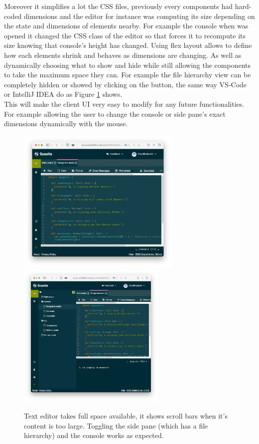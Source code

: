 \documentclass[a4paper,11pt,oneside]{report}
\begin{document}
Moreover it simplifies a lot the CSS files, previously every components had hard-coded dimensions and the editor for instance was computing its size depending on the state and dimensions of elements nearby. For example the console when was opened it changed the CSS class of the editor so that forces it to recompute its size knowing that console's height has changed. Using flex layout allows to define how each elements shrink and behaves as dimensions are changing. As well as dynamically choosing what to show and hide while still allowing the components to take the maximum space they can. For example the file hierarchy view can be completely hidden or showed by clicking on the button, the same way VS-Code or IntelliJ IDEA do as Figure \ref{scrolls} shows.\\
This will make the client UI very easy to modify for any future functionalities. For example allowing the user to change the console or side pane's exact dimensions dynamically with the mouse.


\begin{figure}[h!]
\centering
\includegraphics[height=7cm]{scrollsA.jpeg}
\includegraphics[height=7cm]{scrolls.jpeg}
\caption{Text editor takes full space available, it shows scroll bars when it's content is too large. Toggling the side pane (which has a file hierarchy) and the console works as expected.}
\label{scrolls}
\end{figure}
\end{document}
